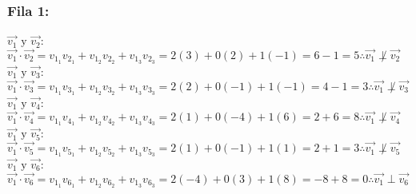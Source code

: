 \documentclass[letterpaper, 12pt]{article}
\begin{document}
\subsubsection*{Fila 1:}
\justify
\(\vec{v_1} \text{ y }\vec{v_2}\):\\ \newline
\(\vec{v_1}\cdot\vec{v_2}=v_{1_1}v_{2_1}+v_{1_2}v_{2_2}+v_{1_3}v_{2_3}=2(3)+0(2)+1(-1)=6-1=5\therefore\vec{v_1}\not\perp \vec{v_2}\)\\ \newline
\(\vec{v_1} \text{ y }\vec{v_3}\):\\ \newline
\(\vec{v_1}\cdot\vec{v_3}=v_{1_1}v_{3_1}+v_{1_2}v_{3_2}+v_{1_3}v_{3_3}=2(2)+0(-1)+1(-1)=4-1=3\therefore\vec{v_1}\not\perp \vec{v_3}\)\\ \newline
\(\vec{v_1} \text{ y }\vec{v_4}\):\\ \newline
\(\vec{v_1}\cdot\vec{v_4}=v_{1_1}v_{4_1}+v_{1_2}v_{4_2}+v_{1_3}v_{4_3}=2(1)+0(-4)+1(6)=2+6=8\therefore\vec{v_1}\not\perp \vec{v_4}\)\\ \newline
\(\vec{v_1} \text{ y }\vec{v_5}\):\\ \newline
\(\vec{v_1}\cdot\vec{v_5}=v_{1_1}v_{5_1}+v_{1_2}v_{5_2}+v_{1_3}v_{5_3}=2(1)+0(-1)+1(1)=2+1=3\therefore\vec{v_1}\not\perp \vec{v_5}\)\\ \newline
\(\vec{v_1} \text{ y }\vec{v_6}\):\\ \newline
\(\vec{v_1}\cdot\vec{v_6}=v_{1_1}v_{6_1}+v_{1_2}v_{6_2}+v_{1_3}v_{6_3}=2(-4)+0(3)+1(8)=-8+8=0\therefore\vec{v_1}\perp \vec{v_6}\)
\end{document}
